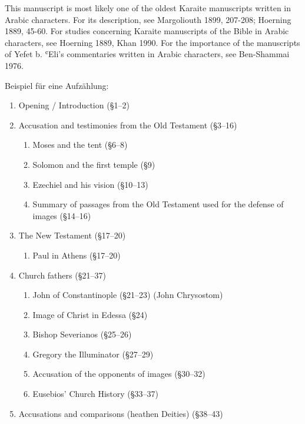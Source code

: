 \documentclass[
  english,
  a4paper,
  DIV=12,
  footlines=2.1,
  usegeometry=true]{scrartcl}
\providecommand{\tightlist}{%
  \setlength{\itemsep}{0pt}\setlength{\parskip}{0pt}}
\begin{document}
\leavevmode\marginpar{\textcolor{parnum}{{[}5{]}}}This manuscript is
most likely one of the oldest Karaite manuscripts written in Arabic
characters. For its description, see Margoliouth 1899, 207-208; Hoerning
1889, 45-60. For studies concerning Karaite manuscripts of the Bible in
Arabic characters, see Hoerning 1889, Khan 1990. For the importance of
the manuscripts of Yefet b. ʿEli's commentaries written in Arabic
characters, see Ben-Shammai 1976.

\leavevmode\marginpar{\textcolor{parnum}{{[}6{]}}}Beispiel für eine
Aufzählung:

\begin{enumerate}
\item
  \leavevmode\marginpar{\textcolor{parnum}{{[}7{]}}}Opening /
  Introduction (§1--2)
\item
  \leavevmode\marginpar{\textcolor{parnum}{{[}8{]}}}Accusation and
  testimonies from the Old Testament (§3--16)

  \begin{enumerate}
  \tightlist
  \item
    \leavevmode\marginpar{\textcolor{parnum}{{[}9{]}}}Moses and the tent
    (§6--8)
  \item
    Solomon and the first temple (§9)
  \item
    Ezechiel and his vision (§10--13)
  \item
    Summary of passages from the Old Testament used for the defense of
    images (§14--16)
  \end{enumerate}
\item
  \leavevmode\marginpar{\textcolor{parnum}{{[}10{]}}}The New Testament
  (§17--20)

  \begin{enumerate}
  \tightlist
  \item
    \leavevmode\marginpar{\textcolor{parnum}{{[}11{]}}}Paul in Athens
    (§17--20)
  \end{enumerate}
\item
  \leavevmode\marginpar{\textcolor{parnum}{{[}12{]}}}Church fathers
  (§21--37)

  \begin{enumerate}
  \tightlist
  \item
    \leavevmode\marginpar{\textcolor{parnum}{{[}13{]}}}John of
    Constantinople (§21--23) (John Chrysostom)
  \item
    Image of Christ in Edessa (§24)
  \item
    Bishop Severianos (§25--26)
  \item
    Gregory the Illuminator (§27--29)
  \item
    Accusation of the opponents of images (§30--32)
  \item
    Eusebios' Church History (§33--37)
  \end{enumerate}
\item
  \leavevmode\marginpar{\textcolor{parnum}{{[}14{]}}}Accusations and
  comparisons (heathen Deities) (§38--43)


\end{enumerate}
\end{document}
